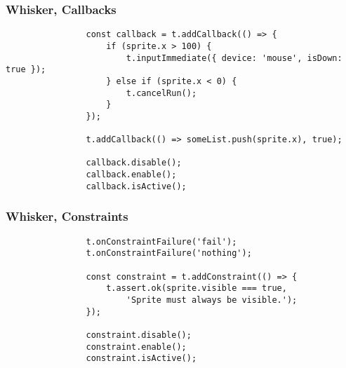 \begin{frame}[fragile]\frametitle{Whisker, Callbacks}
    \begin{center}
        \begin{minipage}{.95\textwidth}
            \begin{verbatim}
                const callback = t.addCallback(() => {
                    if (sprite.x > 100) {
                        t.inputImmediate({ device: 'mouse', isDown: true });
                    } else if (sprite.x < 0) {
                        t.cancelRun();
                    }
                });

                t.addCallback(() => someList.push(sprite.x), true);

                callback.disable();
                callback.enable();
                callback.isActive();
            \end{verbatim}
        \end{minipage}
    \end{center}
\end{frame}

\begin{frame}[fragile]\frametitle{Whisker, Constraints}
    \begin{center}
        \begin{minipage}{.95\textwidth}
            \begin{verbatim}
                t.onConstraintFailure('fail');
                t.onConstraintFailure('nothing');

                const constraint = t.addConstraint(() => {
                    t.assert.ok(sprite.visible === true,
                        'Sprite must always be visible.');
                });

                constraint.disable();
                constraint.enable();
                constraint.isActive();
            \end{verbatim}
        \end{minipage}
    \end{center}
\end{frame}

